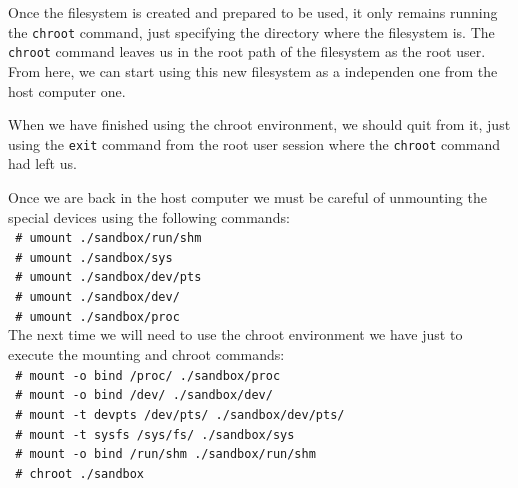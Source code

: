 \documentclass[a4paper,11pt,openany]{report}
\begin{document}
Once the filesystem is created and prepared to be used, it only remains running the \verb#chroot# command, just specifying the directory where the filesystem is. The \verb#chroot# command leaves us in the root path of the filesystem as the root user. From here, we can start using this new filesystem as a independen one from the host computer one.

When we have finished using the chroot environment, we should quit from it, just using the \verb#exit# command from the root user session where the \verb#chroot# command had left us.

Once we are back in the host computer we must be careful of unmounting the special devices using the following commands:\\
\verb$ # umount ./sandbox/run/shm $\\
\verb$ # umount ./sandbox/sys $\\
\verb$ # umount ./sandbox/dev/pts $\\
\verb$ # umount ./sandbox/dev/ $\\
\verb$ # umount ./sandbox/proc $\\

The next time we will need to use the chroot environment we have just to execute the mounting and chroot commands:\\
\verb$ # mount -o bind /proc/ ./sandbox/proc $\\
\verb$ # mount -o bind /dev/ ./sandbox/dev/ $\\
\verb$ # mount -t devpts /dev/pts/ ./sandbox/dev/pts/ $\\
\verb$ # mount -t sysfs /sys/fs/ ./sandbox/sys $\\
\verb$ # mount -o bind /run/shm ./sandbox/run/shm $\\
\verb$ # chroot ./sandbox $\\
\end{document}
